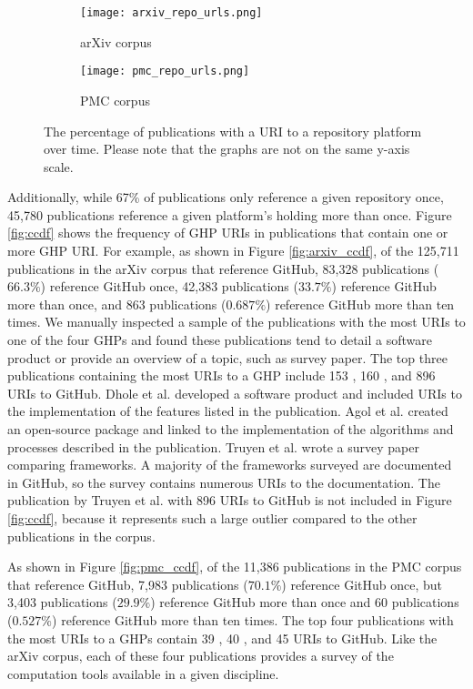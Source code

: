 \begin{figure}[h]
\centering
\begin{subfigure}{\textwidth}
    \texttt{[image: arxiv\_repo\_urls.png]}
    \caption{arXiv corpus}
    \label{fig:arxiv_repo_urls}
\end{subfigure}
\hfill
\begin{subfigure}{\textwidth}
    \texttt{[image: pmc\_repo\_urls.png]}
    \caption{PMC corpus}
    \label{fig:pmc_repo_urls}
\end{subfigure}
        
\caption{The percentage of publications with a URI to a repository platform over time. Please note that the graphs are not on the same y-axis scale.}
\label{fig:repo_urls}
\end{figure}

Additionally, while 67\% of publications only reference a given repository once, 45,780 publications reference a given platform's holding more than once. Figure \ref{fig:ccdf} shows the frequency of GHP URIs in publications that contain one or more GHP URI. For example, as shown in Figure \ref{fig:arxiv_ccdf}, of the 125,711 publications in the arXiv corpus that reference GitHub, 83,328 publications ($66.3\%$) reference GitHub once, 42,383 publications ($33.7\%$) reference GitHub more than once, and 863 publications ($0.687\%$) reference GitHub more than ten times. We manually inspected a sample of the publications with the most URIs to one of the four GHPs and found these publications tend to detail a software product or provide an overview of a topic, such as survey paper. The top three publications containing the most URIs to a GHP include 153 \cite{dhole-arxiv2021}, 160 \cite{agol-arxiv2021}, and 896 \cite{truyen-arxiv2021} URIs to GitHub. Dhole et al. \cite{dhole-arxiv2021} developed a software product and included URIs to the implementation of the features listed in the publication. Agol et al. \cite{agol-arxiv2021} created an open-source package and linked to the implementation of the algorithms and processes described in the publication. Truyen et al. \cite{truyen-arxiv2021} wrote a survey paper comparing frameworks. A majority of the frameworks surveyed are documented in GitHub, so the survey contains numerous URIs to the documentation. The publication by Truyen et al. with 896 URIs to GitHub is not included in Figure \ref{fig:ccdf}, because it represents such a large outlier compared to the other publications in the corpus.

As shown in Figure \ref{fig:pmc_ccdf}, of the 11,386 publications in the PMC corpus that reference GitHub, 7,983 publications ($70.1\%$) reference GitHub once, but 3,403 publications ($29.9\%$) reference GitHub more than once and 60 publications ($0.527\%$) reference GitHub more than ten times. The top four publications with the most URIs to a GHPs contain 39 \cite{kuo-pmc2019,kayani-pmc2021}, 40 \cite{chen-pmc2021}, and 45 \cite{yang-pmc2021} URIs to GitHub. Like the arXiv corpus, each of these four publications provides a survey of the computation tools available in a given discipline.

